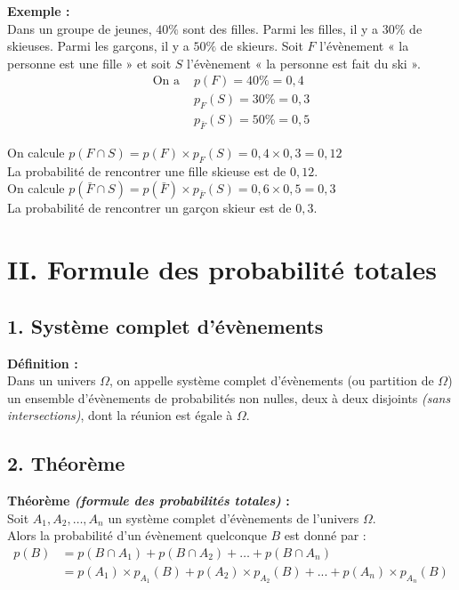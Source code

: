 \documentclass[11pt,a4paper]{article}
\begin{document}
\textbf{Exemple :} ~\\
Dans un groupe de jeunes, $40\%$ sont des filles. Parmi les filles, il y a $30\%$ de skieuses. Parmi les garçons, il y a $50\%$ de skieurs.
Soit $F$ l'évènement « la personne est une fille » et soit $S$ l'évènement « la personne est fait du ski ».
\begin{equation*}
  \begin{split}
    \text{On a }&p(F)=40\%=0,4\\
    &p_F(S)=30\%=0,3 \\
    &p_{\bar{F}}(S)=50\%=0,5
  \end{split}
\end{equation*}

On calcule $p(F\cap S)=p(F)\times p_F(S)=0,4\times0,3=0,12$ \\
La probabilité de rencontrer une fille skieuse est de $0,12$. \\

On calcule $p(\bar F\cap S)=p(\bar F)\times p_{\bar{F}}(S)=0,6\times0,5=0,3$ \\
La probabilité de rencontrer un garçon skieur est de $0,3$.

\section*{II. Formule des probabilité totales}

\subsection*{1. Système complet d'évènements}

\begin{mdframed}[style=definitionStyle]
  \textbf{Définition :} ~\\
  Dans un univers $\Omega$, on appelle système complet d'évènements (ou partition de $\Omega$) un ensemble d'évènements de probabilités non nulles, deux à deux disjoints \emph{(sans intersections)}, dont la réunion est égale à $\Omega$.
\end{mdframed}

\subsection*{2. Théorème}

\begin{mdframed}[style=proprieteStyle]
  \textbf{Théorème \emph{(formule des probabilités totales)} :} ~\\
  Soit $A_1,A_2,\dots,A_n$ un système complet d'évènements de l'univers $\Omega$. \\
  Alors la probabilité d'un évènement quelconque $B$ est donné par :
  \vspace{-8pt}
  \begin{equation*}
    \begin{split}
      p(B)&=p(B\cap A_1)+p(B\cap A_2)+\dots+p(B\cap A_n)\\
      &= p(A_1)\times p_{A_1}(B)+p(A_2)\times p_{A_2}(B)+...+p(A_n)\times p_{A_n}(B)
    \end{split}
  \end{equation*}
\end{mdframed}
\end{document}
